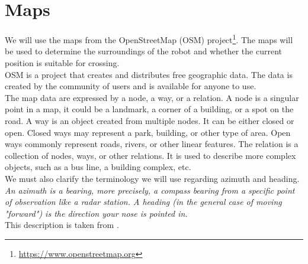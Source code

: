 \section{Maps}
    We will use the maps from the OpenStreetMap (OSM) project\footnote{\url{https://www.openstreetmap.org}}. The maps will be used to determine the surroundings of the robot and whether the current position is suitable for crossing.\\
    OSM is a project that creates and distributes free geographic data. The data is created by the community of users and is available for anyone to use. \cite{OSMwiki}\\
    The map data are expressed by a node, a way, or a relation. A node is a singular point in a map, it could be a landmark, a corner of a building, or a spot on the road. A way is an object created from multiple nodes. It can be either closed or open. Closed ways may represent a park, building, or other type of area. Open ways commonly represent roads, rivers, or other linear features. The relation is a collection of nodes, ways, or other relations. It is used to describe more complex objects, such as a bus line, a building complex, etc.\\
    We must also clarify the terminology we will use regarding azimuth and heading.\\
    \emph{An azimuth is a bearing, more precisely, a compass bearing from a specific point of observation like a radar station. A heading (in the general case of moving "forward") is the direction your nose is pointed in.}\\
    This description is taken from \cite{heading}.
